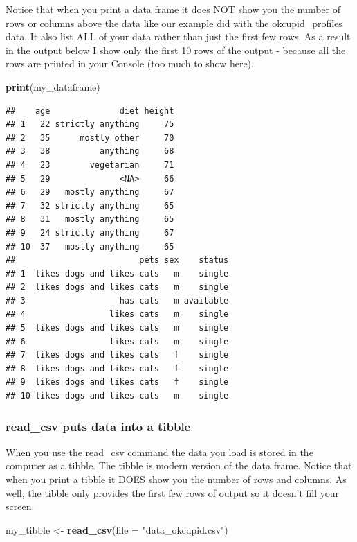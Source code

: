 \documentclass[
]{krantz}
\makeatletter
\newenvironment{Shaded}{\begin{snugshade}}{\end{snugshade}}
\newcommand{\DataTypeTok}[1]{\textcolor[rgb]{0.27,0.27,0.27}{#1}}
\newcommand{\KeywordTok}[1]{\textcolor[rgb]{0.27,0.27,0.27}{\textbf{#1}}}
\newcommand{\NormalTok}[1]{#1}
\newcommand{\StringTok}[1]{\textcolor[rgb]{0.5,0.5,0.5}{#1}}
\newenvironment{kframe}{%
\medskip{}
\setlength{\fboxsep}{.8em}
 \def\at@end@of@kframe{}%
 \ifinner\ifhmode%
  \def\at@end@of@kframe{\end{minipage}}%
  \begin{minipage}{\columnwidth}%
 \fi\fi%
 \def\FrameCommand##1{\hskip\@totalleftmargin \hskip-\fboxsep
 \colorbox{shadecolor}{##1}\hskip-\fboxsep
     \hskip-\linewidth \hskip-\@totalleftmargin \hskip\columnwidth}%
 \MakeFramed {\advance\hsize-\width
   \@totalleftmargin\z@ \linewidth\hsize
   \@setminipage}}%
 {\par\unskip\endMakeFramed%
 \at@end@of@kframe}
\renewenvironment{Shaded}{\begin{kframe}}{\end{kframe}}
\makeatother
\begin{document}
Notice that when you print a data frame it does NOT show you the number of rows or columns above the data like our example did with the okcupid\_profiles data. It also list ALL of your data rather than just the first few rows. As a result in the output below I show only the first 10 rows of the output - because all the rows are printed in your Console (too much to show here).

\begin{Shaded}
\begin{Highlighting}[]
\KeywordTok{print}\NormalTok{(my_dataframe)}
\end{Highlighting}
\end{Shaded}

\begin{verbatim}
##    age              diet height
## 1   22 strictly anything     75
## 2   35      mostly other     70
## 3   38          anything     68
## 4   23        vegetarian     71
## 5   29              <NA>     66
## 6   29   mostly anything     67
## 7   32 strictly anything     65
## 8   31   mostly anything     65
## 9   24 strictly anything     67
## 10  37   mostly anything     65
##                         pets sex    status
## 1  likes dogs and likes cats   m    single
## 2  likes dogs and likes cats   m    single
## 3                   has cats   m available
## 4                 likes cats   m    single
## 5  likes dogs and likes cats   m    single
## 6                 likes cats   m    single
## 7  likes dogs and likes cats   f    single
## 8  likes dogs and likes cats   f    single
## 9  likes dogs and likes cats   f    single
## 10 likes dogs and likes cats   m    single
\end{verbatim}

\hypertarget{read_csv-puts-data-into-a-tibble}{%
\subsubsection{read\_csv puts data into a tibble}\label{read_csv-puts-data-into-a-tibble}}

When you use the read\_csv command the data you load is stored in the computer as a tibble. The tibble is modern version of the data frame. Notice that when you print a tibble it DOES show you the number of rows and columns. As well, the tibble only provides the first few rows of output so it doesn't fill your screen.

\begin{Shaded}
\begin{Highlighting}[]
\NormalTok{my_tibble <-}\StringTok{ }\KeywordTok{read_csv}\NormalTok{(}\DataTypeTok{file =} \StringTok{"data_okcupid.csv"}\NormalTok{)}
\end{Highlighting}
\end{Shaded}
\end{document}
